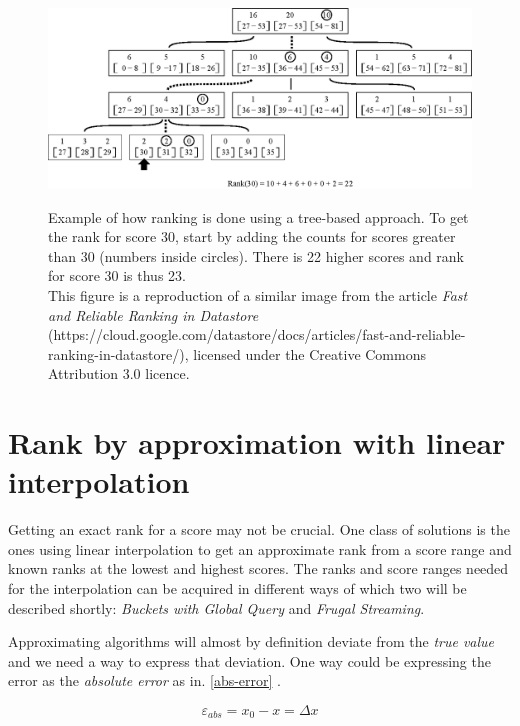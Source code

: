 \begin{figure}[h!]
  \centering
  \caption{
    Example of how ranking is done using a tree-based approach. To get the rank for score 30, start by adding the counts for scores greater than 30 (numbers inside circles). There is 22 higher scores and rank for score 30 is thus 23.\\This figure is a reproduction of a similar image from the article \emph{Fast and Reliable Ranking in Datastore} (https://cloud.google.com/datastore/docs/articles/fast-and-reliable-ranking-in-datastore/), licensed under the Creative Commons Attribution 3.0 licence.}\label{fig:tree}
\hbox{\hspace{-0.8cm}
  \includegraphics[width=15cm]{img/tree.eps}}
\end{figure}

\section{Rank by approximation with linear interpolation}

Getting an exact rank for a score may not be crucial. One class of solutions is the ones using linear interpolation to get an approximate rank from a score range and known ranks at the lowest and highest scores. The ranks and score ranges needed for the interpolation can be acquired in different ways of which two will be described shortly: \emph{Buckets with Global Query} and \emph{Frugal Streaming}.

Approximating algorithms will almost by definition deviate from the \emph{true value} and we need a way to express that deviation. One way could be expressing the error as the \emph{absolute error} as in. \ref{abs-error} \cite{pohl}.  

\begin{equation}
  \label{abs-error}
  \varepsilon_{abs} = x_0 - x = \Delta x
\end{equation}

